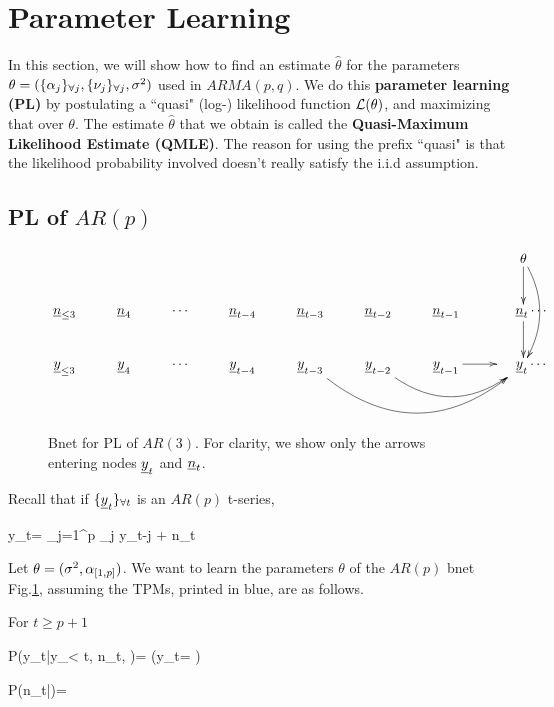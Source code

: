 \section{Parameter Learning}
\label{sec-time-arma-param-learn}

In this section,
we will show
how to find an estimate
$\hat{\theta}$
for the parameters
$\theta=(\{\alpha_j\}_{\forall j}, \{\nu_j\}_{\forall j},
\sigma^2)$
used in
$ARMA(p,q)$.
We do this {\bf parameter learning (PL)} by
postulating a ``quasi" (log-)
 likelihood function
${\cal L}(\theta)$,
and
maximizing
that over $\theta$.
The estimate $\hat{\theta}$
that we obtain is called 
the
{\bf Quasi-Maximum Likelihood Estimate
 (QMLE)}.
The reason for
using the prefix ``quasi"
is that the likelihood
probability
involved doesn't really satisfy
the i.i.d assumption.

\subsection{PL of $AR(p)$}



\begin{figure}[h!]
$$
\xymatrix{
&&&&&&&\theta\ar[d]\ar@/^1pc/[dd]
\\
\rvn_{\leq 3}
&\rvn_{4}
&\cdots
&\rvn_{t-4}
&\rvn_{t-3}
&\rvn_{t-2}
&\rvn_{t-1}
&\;\;\;\;\rvn_{t}\ar[d]
\cdots
\\
\rvy_{\leq 3}
&\rvy_{4}
&\cdots
&\rvy_{t-4}
&\rvy_{t-3}\ar@/_3pc/[rrr]
&\rvy_{t-2}\ar@/_2pc/[rr]
&\rvy_{t-1}\ar[r]
&\;\;\;\;\rvy_{t}
\cdots
\\
\;
}
$$
\caption{Bnet for 
PL of
$AR(3)$.
For clarity,
we show only the
arrows entering nodes ${\underline{y}}_t$
and ${\underline{n}}_t$.}
\label{fig-qmle-ar-3}
\end{figure}

Recall that if ${\{{\underline{y}}_t\}_{\forall t}}$
is an  $AR(p)$
t-series,

\beq
y_t=
\sum_{j=1}^p
\alp_j y_{t-j} + n_t
\label{eq-qmle-ar-p-def}
\eeq

Let $\theta=(\sigma^2, \alpha_{[1,p]})$.
We want to learn the parameters
$\theta$ of the $AR(p)$ bnet 
Fig.\ref{fig-qmle-ar-3},
assuming the TPMs, printed in blue,
are as follows.


For $t\geq p+1$

\beq\color{blue}
P(y_t|y_{< t}, n_t, \theta)=
\indi\left(y_t=
\right)
\eeq


\beq\color{blue}
P(n_t|\theta)=
{\s\sqrt{2\pi}}
\exp{}
\eeq

